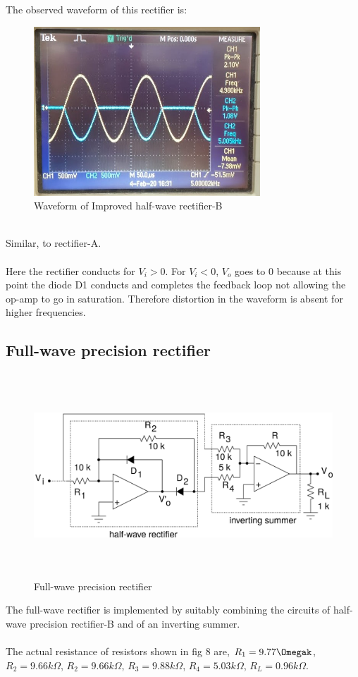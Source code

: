 \documentclass[12pt]{article}
\begin{document}
        The observed waveform of this rectifier is: 
        \begin{figure}[H]
            \centering
            \includegraphics[width = 0.6\linewidth, height = 2.5in]{reports/lab3/half-wave-rect-B-5k.jpeg}
            \caption{Waveform of Improved half-wave rectifier-B}
        \end{figure}
        \\
        Similar, to rectifier-A.\\
        \\
        Here the rectifier conducts for $V_i > 0$. For $V_i < 0$, $V_o$ goes to 0 because at this point the diode D1 conducts and completes the feedback loop not allowing the op-amp to go in saturation. Therefore distortion in the waveform is absent for higher frequencies.

\subsection{Full-wave precision rectifier}
     \begin{figure}[H]
        \centering
        \includegraphics[width = \linewidth, height = 3in]{reports/lab3/full-wave.png}
        \caption{Full-wave precision rectifier}
    \end{figure}   
        The full-wave rectifier is implemented by suitably combining the circuits of half-wave precision rectifier-B and of an inverting summer.\\
        \\
        The actual resistance of resistors shown in fig 8 are,
        $R_1 = 9.77\Omegak$, $R_2 = 9.66k\Omega$, $R_2 = 9.66k\Omega$, $R_3 = 9.88k\Omega$, $R_4 = 5.03k\Omega$, $R_L = 0.96k\Omega$.\\
        \\
        
\end{document}

